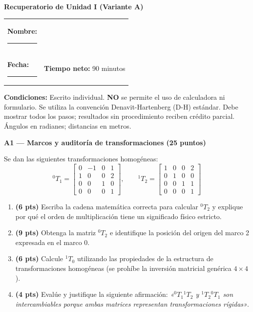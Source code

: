 \documentclass[11pt, a4paper]{article}
\begin{document}
\begin{center}
    \Large\textbf{\textcolor{ucbblue}{Recuperatorio de Unidad I (Variante A)}}
\end{center}

\vspace{0.2cm}
\noindent\begin{tabular}{ll}
\textbf{Nombre:} \rule{7cm}{0.15mm} \\
\textbf{Fecha:} \rule{4cm}{0.15mm} & \textbf{Tiempo neto:} 90 minutos
\end{tabular}

\vspace{0.3cm}
\begin{tcolorbox}[colback=red!5, colframe=red!80!black, left=2mm, right=2mm, top=1mm, bottom=1mm]
    \small\textbf{Condiciones:} Escrito individual. \textbf{NO} se permite el uso de calculadora ni formulario. Se utiliza la convención Denavit-Hartenberg (D-H) estándar. Debe mostrar todos los pasos; resultados sin procedimiento reciben crédito parcial. Ángulos en radianes; distancias en metros.
\end{tcolorbox}

\vspace{0.4cm}
\noindent\textbf{\large A1 — Marcos y auditoría de transformaciones (25 puntos)}

Se dan las siguientes transformaciones homogéneas:
\begin{equation*}
    {}^0T_1=\begin{bmatrix}0&-1&0&1\\1&0&0&2\\0&0&1&0\\0&0&0&1\end{bmatrix},\qquad
    {}^1T_2=\begin{bmatrix}1&0&0&2\\0&1&0&0\\0&0&1&1\\0&0&0&1\end{bmatrix} \text{}
\end{equation*}

\begin{enumerate}
    \item \textbf{(6 pts)} Escriba la cadena matemática correcta para calcular ${}^0T_2$ y explique por qué el orden de multiplicación tiene un significado físico estricto.
    \item \textbf{(9 pts)} Obtenga la matriz ${}^0T_2$ e identifique la posición del origen del marco 2 expresada en el marco 0.
    \item \textbf{(6 pts)} Calcule ${}^1T_0$ utilizando las propiedades de la estructura de transformaciones homogéneas (se prohíbe la inversión matricial genérica $4\times 4$).
    \item \textbf{(4 pts)} Evalúe y justifique la siguiente afirmación: \textit{«${}^0T_1{}^1T_2$ y ${}^1T_2{}^0T_1$ son intercambiables porque ambas matrices representan transformaciones rígidas»}.
\end{enumerate}
\end{document}
